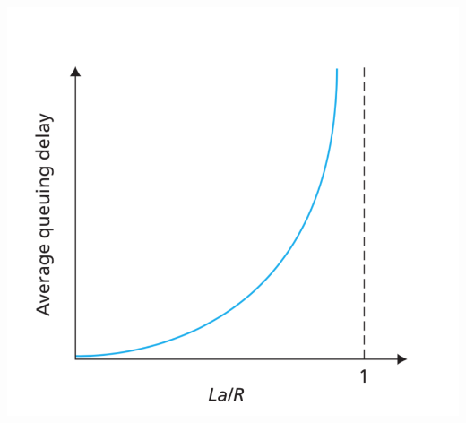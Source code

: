 \documentclass{article}
\begin{document}
\begin{enumerate}
	\includegraphics[scale=0.6]{./delay} 
\end{enumerate}
\end{document}
